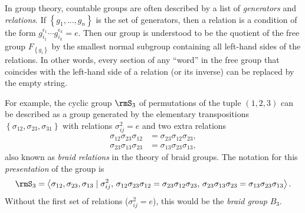 \begin{rem}
In group theory, countable groups are often described
by a list of \emph{generators} and \emph{relations}. If $\left\{ g_{1},\ldots,g_{n}\right\} $
is the set of generators, then a relation is a condition of the form
$g_{i_{1}}^{\epsilon_{1}}\cdots g_{i_{k}}^{\epsilon_{k}}=e$. Then
our group is understood to be the quotient of the free group $F_{\left\{ g_{i}\right\} }$
by the smallest normal subgroup containing all left-hand sides of the
relations. In other words, every section of any ``word'' in the
free group that coincides with the left-hand side of a relation (or
its inverse) can be replaced by the empty string.

For example, the cyclic group $\rmS_{3}$ of permutations of the tuple $(1,2,3) $
can be described as a group generated by the elementary transpositions
$\left\{ \sigma_{12},\sigma_{23},\sigma_{31}\right\} $ with relations
$\sigma_{ij}^{2}=e$ and two extra relations
\begin{align}
\sigma_{12}\sigma_{23}\sigma_{12} & =\sigma_{23}\sigma_{12}\sigma_{23},\nonumber \\
\sigma_{23}\sigma_{13}\sigma_{23} & =\sigma_{13}\sigma_{23}\sigma_{13},
\end{align}
also known as \emph{braid relations} in the theory of braid groups.
The notation for this \emph{presentation} of the group is 
\begin{equation}
\rmS_{3}=\left\langle \sigma_{12},\sigma_{23},\sigma_{13}\mid\sigma_{ij}^{2},\,\sigma_{12}\sigma_{23}\sigma_{12}=\sigma_{23}\sigma_{12}\sigma_{23},\,\sigma_{23}\sigma_{13}\sigma_{23}=\sigma_{13}\sigma_{23}\sigma_{13}\right\rangle .
\end{equation}
Without the first set of relations ($\sigma_{ij}^{2}=e$), this would
be the \emph{braid group} $B_{3}$.
\end{rem}
%

